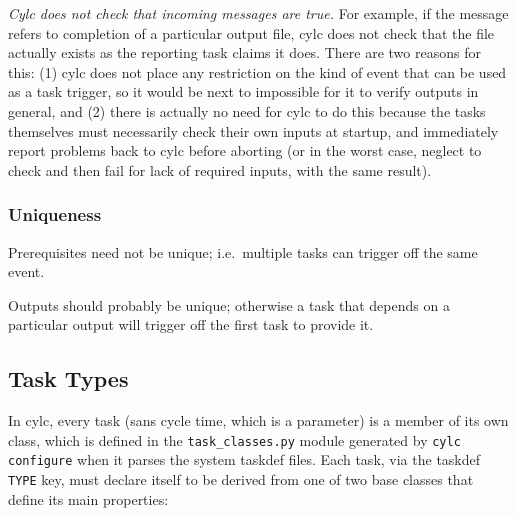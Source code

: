 \documentclass[11pt,a4paper]{article}
\begin{document}
{\em Cylc does not check that incoming messages are true.}  For example,
if the message refers to completion of a particular output file, cylc
does not check that the file actually exists as the reporting task
claims it does. There are two reasons for this: (1) cylc does not place
any restriction on the kind of event that can be used as a task trigger,
so it would be next to impossible for it to verify outputs in general,
and (2) there is actually no need for cylc to do this because the tasks
themselves must necessarily check their own inputs at startup, and
immediately report problems back to cylc before aborting (or in the
worst case, neglect to check and then fail for lack of required inputs,
with the same result).


\subsubsection{Uniqueness}

Prerequisites need not be unique; i.e.\ multiple tasks can trigger off
the same event.

Outputs should probably be unique; otherwise a task that depends on a
particular output will trigger off the first task to provide it.


\subsection{Task Types} 

In cylc, every task (sans cycle time, which is a parameter) is a member
of its own class, which is defined in the \lstinline=task_classes.py=
module generated by \lstinline=cylc configure= when it parses the system
taskdef files.  Each task, via the taskdef \lstinline=TYPE= key, must
declare itself to be derived from one of two base classes that define
its main properties:
\end{document}
